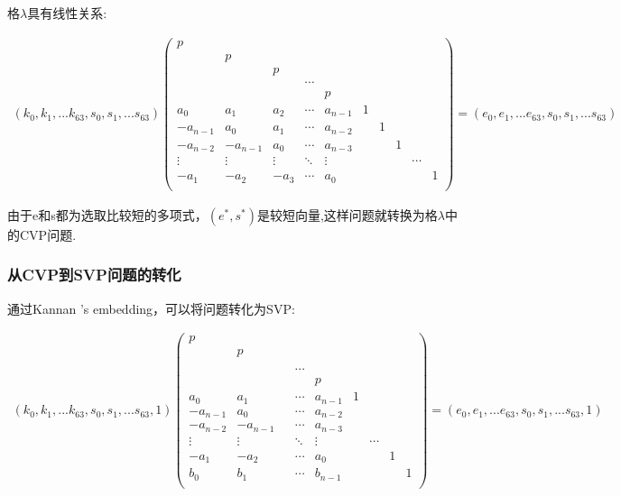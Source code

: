 \documentclass[12pt,a4paper]{article}
\newcommand{\supercite}[2][]{\textsuperscript{\citep[#1]{#2}}}
\numberwithin{equation}{section}
\begin{document}
格$\lambda$具有线性关系:

\begin{align}
	(k_0,k_1,...k_{63},s_0,s_1,...s_{63})
	\left(
	\begin{smallmatrix}
			p\\
			&p\\
			&&p\\
			&&&\cdots\\
			&&&&p\\
			a_0    &a_1    &a_2   &\cdots &a_{n-1}            &1\\
			-a_{n-1}&a_0    &a_1   &\cdots &a_{n-2}       &&1\\
			-a_{n-2}&-a_{n-1}&a_0   &\cdots &a_{n-3}  &&&1\\
			\vdots &\vdots &\vdots&\ddots &\vdots             &&&&\cdots\\
			-a_1    &-a_2    &-a_3   &\cdots &a_0 &&&&&1\\
		\end{smallmatrix}
	\right)
	=
	(e_0,e_1,...e_{63},s_0,s_1,...s_{63})
\end{align}

由于e和s都为选取比较短的多项式，$(e^*,s^*)$是较短向量,这样问题就转换为格$\lambda$中的CVP问题.

\subsubsection{从CVP到SVP问题的转化}
通过Kannan 's embedding\supercite[]{kannan1987}，可以将问题转化为SVP:

\begin{align}
	(k_0,k_1,...k_{63},s_0,s_1,...s_{63},1)
	\left(
	\begin{smallmatrix}
			p\\
			&p\\
			&&\\
			&&&\cdots\\
			&&&&p\\
			a_0    &a_1    &   &\cdots &a_{n-1}            &1\\
			-a_{n-1}&a_0    &   &\cdots &a_{n-2}       &&\\
			-a_{n-2}&-a_{n-1}&   &\cdots &a_{n-3}  &&\\
			\vdots &\vdots &&\ddots &\vdots             &&\cdots\\
			-a_1    &-a_2    &   &\cdots &a_0 &&&1\\
			b_0    &b_1    &   &\cdots &b_{n-1}&&&&1\\
		\end{smallmatrix}
	\right)
	=
	(e_0,e_1,...e_{63},s_0,s_1,...s_{63},1)
\end{align}
\end{document}
